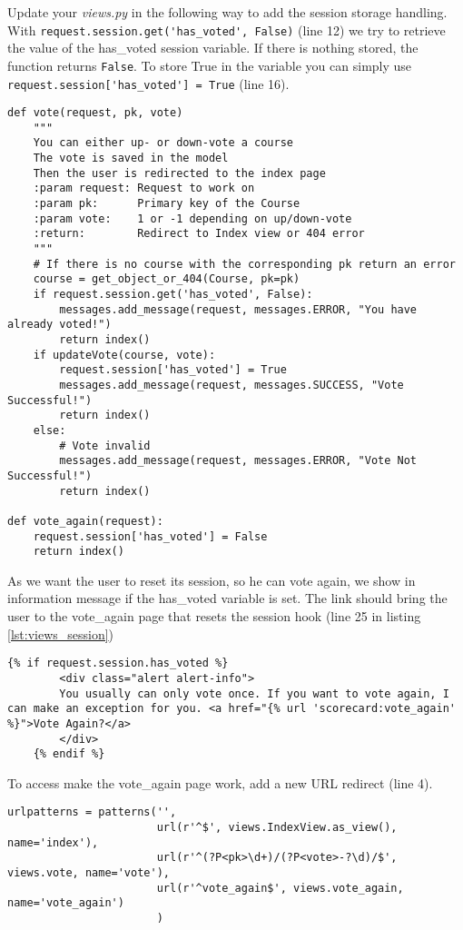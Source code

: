 Update your \emph{views.py} in the following way to add the session storage handling. With \lstinline|request.session.get('has_voted', False)| (line 12) we try to retrieve the value of the has\_voted session variable. If there is nothing stored, the function returns \lstinline|False|. To store True in the variable you can simply use \lstinline|request.session['has_voted'] = True| (line 16).
\begin{lstlisting}[style=Python, caption=Session handling in vote view, label=lst:views_session]
def vote(request, pk, vote)
    """
    You can either up- or down-vote a course
    The vote is saved in the model
    Then the user is redirected to the index page
    :param request: Request to work on
    :param pk:      Primary key of the Course
    :param vote:    1 or -1 depending on up/down-vote
    :return:        Redirect to Index view or 404 error
    """
    # If there is no course with the corresponding pk return an error
    course = get_object_or_404(Course, pk=pk)
    if request.session.get('has_voted', False):
        messages.add_message(request, messages.ERROR, "You have already voted!")
        return index()
    if updateVote(course, vote):
        request.session['has_voted'] = True
        messages.add_message(request, messages.SUCCESS, "Vote Successful!")
        return index()
    else:
        # Vote invalid
        messages.add_message(request, messages.ERROR, "Vote Not Successful!")
        return index()

def vote_again(request):
    request.session['has_voted'] = False
    return index()
\end{lstlisting}

As we want the user to reset its session, so he can vote again, we show in information message if the has\_voted variable is set. The link should bring the user to the vote\_again page that resets the session hook (line 25 in listing \ref{lst:views_session})
\begin{lstlisting}[style=HTML, caption=index.html, label=lst:index.html1]
    {% if request.session.has_voted %}
        <div class="alert alert-info">
        You usually can only vote once. If you want to vote again, I can make an exception for you. <a href="{% url 'scorecard:vote_again' %}">Vote Again?</a>
        </div>
    {% endif %}
\end{lstlisting}

To access make the vote\_again page work, add a new URL redirect (line 4).
\begin{lstlisting}[style=Python, caption=urls.py, label=lst:urls.py1]
urlpatterns = patterns('',
                       url(r'^$', views.IndexView.as_view(), name='index'),
                       url(r'^(?P<pk>\d+)/(?P<vote>-?\d)/$', views.vote, name='vote'),
                       url(r'^vote_again$', views.vote_again, name='vote_again')
                       )
\end{lstlisting}